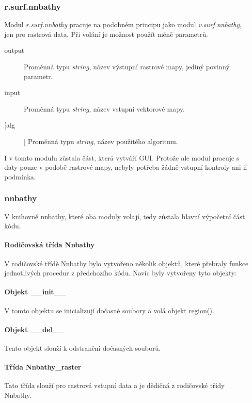\documentclass[12pt,a4paper]{article}
\begin{document}
\subsubsection{r.surf.nnbathy}
Modul \emph{r.surf.nnbathy} pracuje na podobném principu jako modul \emph{v.surf.nnbathy}, jen pro rastrová data. Při volání je možnost použít méně parametrů.
\begin{description}
\item[output] Proměnná typu \emph{string}, název výstupní rastrové mapy, jediný povinný parametr.
\item[input] Proměnná typu \emph{string}, název vstupní vektorové mapy.
\item[[alg]] Proměnná typu \emph{string}, název použitého algoritmu.
\end{description}


I v tomto modulu zůstala část, která vytváří GUI. Protože ale modul pracuje s daty pouze v podobě rastrové mapy, nebyly potřeba žádně vstupní kontroly ani if podmínka.

\newpage
\subsubsection{nnbathy}
V knihovně nnbathy, které oba moduly volají, tedy zůstala hlavní výpočetní část kódu. 

\paragraph{Rodičovská třída Nnbathy} V rodičovské třídě Nnbathy bylo vytvořeno několik objektů, které přebraly funkce jednotlivých procedur z předchozího kódu. Navíc byly vytvořeny tyto objekty:

\paragraph{Objekt \_\_init\_\_}
V tomto objektu se inicializují dočasné soubory a volá objekt region().

\paragraph{Objekt \_\_del\_\_}
Tento objekt slouží k odstranění dočasných souborů.

\paragraph{Třída Nnbathy\_raster}
Tato třída slouží pro rastrová vstupní data a je dědičná z rodičovské třídy Nnbathy.
\end{document}

